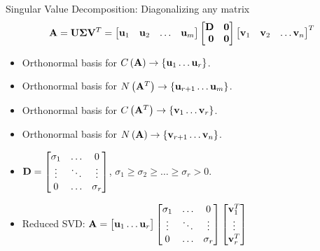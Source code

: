 \documentclass[aspectratio=169]{beamer}
\def\mf{\ensuremath\mathbf}
\def\lp{\ensuremath\left(}
\def\rp{\ensuremath\right)}
\def\lc{\ensuremath\left\{}
\def\rc{\ensuremath\right\}}
\def\bmx{\ensuremath\begin{bmatrix*}[r]}
\def\emx{\ensuremath\end{bmatrix*}}
\def\bmxc{\ensuremath\begin{bmatrix*}[c]}
\begin{document}
\begin{frame}[t]{Singular Value Decomposition: Diagonalizing any matrix}
\[ \mf{A} = \mf{U}\mf{\Sigma}\mf{V}^T = \bmx \mf{u}_1 & \mf{u}_2 & \ldots & \mf{u}_m\emx \bmx \mf{D} & \mf{0}\\ \mf{0} & \mf{0} \emx \bmx \mf{v}_1 & \mf{v}_2 & \ldots \mf{v}_n \emx^T\]

\begin{itemize}
    \item Orthonormal basis for $C\lp\mf{A}\rp \rightarrow \lc\mf{u}_{1}\ldots\mf{u}_{r}\rc$.
    
    \item Orthonormal basis for $N\lp\mf{A}^T\rp \rightarrow \lc\mf{u}_{r+1}\ldots\mf{u}_{m}\rc$.
    
    \item Orthonormal basis for $C\lp\mf{A}^T\rp \rightarrow \lc\mf{v}_{1}\ldots\mf{v}_{r}\rc$.
    \item Orthonormal basis for $N\lp\mf{A}\rp \rightarrow \lc\mf{v}_{r+1}\ldots\mf{v}_{n}\rc$.
    
    \item $\mf{D} = \bmxc \sigma_{1} & \ldots & 0\\\vdots & \ddots & \vdots\\0 & \ldots & \sigma_r\emx$, $\sigma_1 \geq \sigma_2 \geq \ldots \geq \sigma_r > 0$.

    \item Reduced SVD: $\mf{A} = \bmxc\mf{u}_1 \ldots \mf{u}_r\emx \bmxc \sigma_{1} & \ldots & 0\\\vdots & \ddots & \vdots\\0 & \ldots & \sigma_r\emx \bmxc\mf{v}_1^T\\\vdots\\\mf{v}_r^T\emx $
\end{itemize}
\end{frame}
\end{document}
